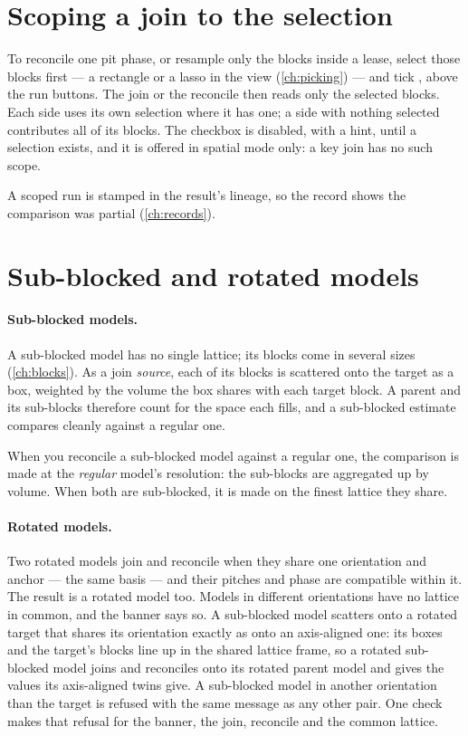 \section{Scoping a join to the selection}\label{sec:joins-selection}

To reconcile one pit phase, or resample only the blocks inside a lease, select those blocks first — a rectangle or a lasso in the view (\cref{ch:picking}) — and tick , above the run buttons. The join or the reconcile then reads only the selected blocks. Each side uses its own selection where it has one; a side with nothing selected contributes all of its blocks. The checkbox is disabled, with a hint, until a selection exists, and it is offered in spatial mode only: a key join has no such scope.

A scoped run is stamped  in the result's lineage, so the record shows the comparison was partial (\cref{ch:records}).

\section{Sub-blocked and rotated models}\label{sec:joins-special}

\paragraph{Sub-blocked models.} A sub-blocked model has no single lattice; its blocks come in several sizes (\cref{ch:blocks}). As a join \emph{source}, each of its blocks is scattered onto the target as a box, weighted by the volume the box shares with each target block. A parent and its sub-blocks therefore count for the space each fills, and a sub-blocked estimate compares cleanly against a regular one.

When you reconcile a sub-blocked model against a regular one, the comparison is made at the \emph{regular} model's resolution: the sub-blocks are aggregated up by volume. When both are sub-blocked, it is made on the finest lattice they share.

\paragraph{Rotated models.} Two rotated models join and reconcile when they share one orientation and anchor — the same basis — and their pitches and phase are compatible within it. The result is a rotated model too. Models in different orientations have no lattice in common, and the banner says so. A sub-blocked model scatters onto a rotated target that shares its orientation exactly as onto an axis-aligned one: its boxes and the target's blocks line up in the shared lattice frame, so a rotated sub-blocked model joins and reconciles onto its rotated parent model and gives the values its axis-aligned twins give. A sub-blocked model in another orientation than the target is refused with the same  message as any other pair. One check makes that refusal for the banner, the join, reconcile and the common lattice.

